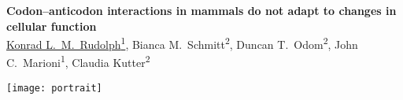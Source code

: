 \documentclass[a0,portrait]{a0poster}
\begin{document}
\sffamily

\noindent
\begin{minipage}[][10cm][t]{0.88\textwidth}
    {
        \VeryHuge\color{accent}\bfseries\sffamily%
        Codon–anticodon interactions in mammals do not adapt to changes in
        cellular function
    }
    {
        \\[\baselineskip]
        \noindent
        \Large\color{Black}%
        \underline{Konrad L.\ M.\ Rudolph\textsuperscript{1}},
        Bianca M.\ Schmitt\textsuperscript{2},
        Duncan T.\ Odom\textsuperscript{2},
        John C.\ Marioni\textsuperscript{1},
        Claudia Kutter\textsuperscript{2}
    }
\end{minipage}%
\hfill%
\begin{minipage}[][10cm][t]{0.1\textwidth}
    \raggedleft
    \texttt{[image: portrait]}
\end{minipage}

\vspace{3cm}
\Large
\end{document}
